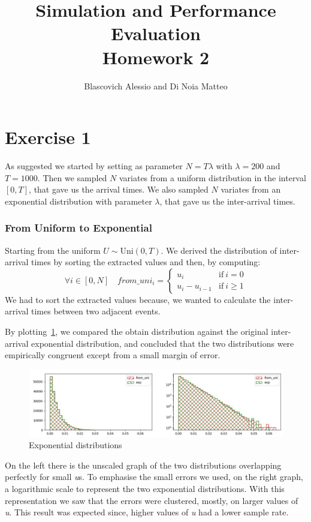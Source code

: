 \documentclass[10pt,a4paper]{article}
\title{
  {\Huge Simulation and Performance Evaluation}\\
  \huge Homework 2 \\
}
\author{Blascovich Alessio and Di Noia Matteo}
\begin{document}
\maketitle

\section*{Exercise 1}

As suggested we started by setting as parameter \(N=T\lambda\) with \(\lambda = 200\) and \(T = 1000\). Then we sampled \(N\) variates from a uniform distribution in the interval \([0,T]\), that gave us the arrival times. We also sampled \(N\) variates from an exponential distribution with parameter \(\lambda\), that gave us the inter-arrival times.
\subsubsection*{From Uniform to Exponential}
Starting from the uniform \(U\sim\text{Uni}(0, T)\). We derived the distribution of inter-arrival times by sorting the extracted values and then, by computing:
\begin{equation*}
  \forall i\in[0,N]\quad from\_uni_{i} =
  \begin{cases}
    u_{i} & \text{if}\ i = 0\\
    u_{i} - u_{i-1} & \text{if}\ i\geq 1
  \end{cases}
\end{equation*}
We had to sort the extracted values because, we wanted to calculate the inter-arrival times between two adjacent events.

By plotting~\ref{fig:1}, we compared the obtain distribution against the original inter-arrival exponential distribution, and concluded that the two distributions were empirically congruent except from a small margin of error.

\begin{figure}[h]
  \centering
  \includegraphics[scale=0.5]{es1-1.png}
  \caption{Exponential distributions}
  \label{fig:1}
\end{figure}

On the left there is the unscaled graph of the two distributions overlapping perfectly for small \emph{u}s. To emphasise the small errors we used, on the right graph, a logarithmic scale to represent the two exponential distributions. With this representation we saw that the errors were clustered, mostly, on larger values of \emph{u}. This result was expected since, higher values of \emph{u} had a lower sample rate.
\end{document}
